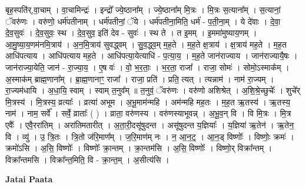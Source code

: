 \documentclass[17pt]{extarticle}
\begin{document}
बृह॒स्पति॑र्,वा॒चाम् । वा॒चामिन्द्रः॑ । इन्द्रो᳚ ज्ये॒ष्ठाना᳚म् । ज्ये॒ष्ठाना᳚म् मि॒त्रः । मि॒त्रः स॒त्याना᳚म् । स॒त्यानां॒ ॅवरु॑णः । वरु॑णो॒ धर्म॑पतीनाम् । धर्म॑पतीनां॒ ॅये । धर्म॑पतीना॒मिति॒ धर्म॑ - प॒ती॒ना॒म् । ये दे॑वाः । दे॒वा॒ दे॒व॒सुवः॑ । दे॒व॒सुवः॒ स्थ । दे॒व॒सुव॒ इति॑ देव - सुवः॑ । स्थ ते । त इ॒मम् । इ॒ममा॑मुष्याय॒णम् । आ॒मु॒ष्या॒य॒णम॑नमि॒त्राय॑ । अ॒न॒मि॒त्राय॑ सुवद्ध्वम् । सु॒व॒द्ध्व॒म् म॒ह॒ते । म॒ह॒ते क्ष॒त्राय॑ । क्ष॒त्राय॑ मह॒ते । म॒ह॒त आधि॑पत्याय । आधि॑पत्याय मह॒ते । आधि॑पत्या॒येत्याधि॑ - प॒त्या॒य॒ । म॒ह॒ते जान॑राज्याय । जान॑राज्यायै॒षः । जान॑राज्या॒येति॒ जान॑ - रा॒ज्या॒य॒ । ए॒ष वः॑ । वो॒ भ॒र॒ताः॒ । भ॒र॒ता॒ राजा᳚ । राजा॒ सोमः॑ । सोमो॒ऽस्माक᳚म् । अ॒स्माक॑म् ब्राह्म॒णाना᳚म् । ब्रा॒ह्म॒णानाꣳ॒॒ राजा᳚ । राजा॒ प्रति॑ । प्रति॒ त्यत् । त्यन्नाम॑ । नाम॑ रा॒ज्यम् । रा॒ज्यम॑धायि । अ॒धा॒यि॒ स्वाम् । स्वाम् त॒नुव᳚म् ॥ त॒नुवं॒ ॅवरु॑णः । वरु॑णो अशिश्रेत् । अ॒शि॒श्रे॒च्छुचेः᳚ । शुचे᳚र् मि॒त्रस्य॑ । मि॒त्रस्य॒ व्रत्याः᳚ । व्रत्या॑ अभूम । अ॒भू॒माम॑न्महि । अम॑न्महि मह॒तः । म॒ह॒त ऋ॒तस्य॑ । ऋ॒तस्य॒ नाम॑ । नाम॒ सर्वे᳚ । सर्वे॒ व्राताः᳚ ( ) । व्राता॒ वरु॑णस्य । वरु॑णस्याभूवन्न् । अ॒भू॒व॒न् वि । वि मि॒त्रः । मि॒त्र एवैः᳚ । एवै॒ररा॑तिम् । अरा॑तिमतारीत् । अ॒ता॒री॒दसू॑षुदन्त । असू॑षुदन्त य॒ज्ञियाः᳚ । य॒ज्ञिया॑ ऋ॒तेन॑ । ऋ॒तेन॒ वि । व्यु॑ । उ॒ त्रि॒तः । त्रि॒तो ज॑रि॒माण᳚म् । ज॒रि॒माण॑म् नः । न॒ आ॒न॒ट्॒ । आ॒न॒ड् विष्णोः᳚ । विष्णोः॒ क्रमः॑ । क्रमो॑ऽसि । अ॒सि॒ विष्णोः᳚ । विष्णोः᳚ क्रा॒न्तम् । क्रा॒न्तम॑सि । अ॒सि॒ विष्णोः᳚ । विष्णो॒र् विक्रा᳚न्तम् । विक्रा᳚न्तमसि । विक्रा᳚न्त॒मिति॒ वि - क्रा॒न्त॒म् । अ॒सीत्य॑सि । \newline

\textbf{Jatai Paata} \newline
\end{document}
